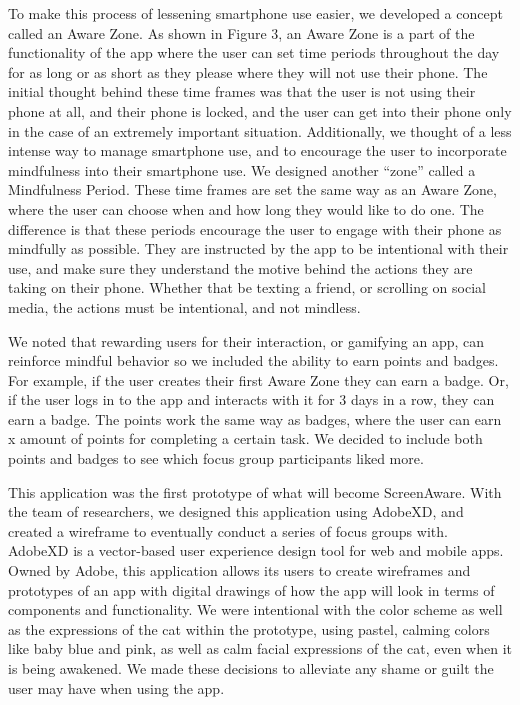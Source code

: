\documentclass[12pt, title page, manuscript, nonacm]{acmart}
\begin{document}
\par To make this process of lessening smartphone use easier, we developed a concept called an Aware Zone\cite{kim2019goalkeeper}. As shown in Figure 3, an Aware Zone is a part of the functionality of the app where the user can set time periods throughout the day for as long or as short as they please where they will not use their phone. The initial thought behind these time frames was that the user is not using their phone at all, and their phone is locked, and the user can get into their phone only in the case of an extremely important situation. Additionally, we thought of a less intense way to manage smartphone use, and to encourage the user to incorporate mindfulness into their smartphone use. We designed another “zone” called a Mindfulness Period\cite{weissinger2019mindful}. These time frames are set the same way as an Aware Zone, where the user can choose when and how long they would like to do one. The difference is that these periods encourage the user to engage with their phone as mindfully as possible. They are instructed by the app to be intentional with their use, and make sure they understand the motive behind the actions they are taking on their phone. Whether that be texting a friend, or scrolling on social media, the actions must be intentional, and not mindless. 
\par We noted that rewarding users for their interaction, or gamifying an app, can reinforce mindful behavior so we included the ability to earn points and badges\cite{weber2018convergence}. For example, if the user creates their first Aware Zone they can earn a badge. Or, if the user logs in to the app and interacts with it for 3 days in a row, they can earn a badge\cite{miller2016game}. The points work the same way as badges, where the user can earn x amount of points for completing a certain task. We decided to include both points and badges\cite{toth2016introduction} to see which focus group participants liked more.
\par This application was the first prototype of what will become ScreenAware. With the team of researchers, we designed this application using AdobeXD, and created a wireframe to eventually conduct a series of focus groups with. AdobeXD is a vector-based user experience design tool for web and mobile apps. Owned by Adobe, this application allows its users to create wireframes and prototypes of an app  with digital drawings of how the app will look in terms of components and functionality. 
We were intentional with the color scheme as well as the expressions of the cat within the prototype, using pastel, calming colors like baby blue and pink\cite{yildirim2011effects}, as well as calm facial expressions of the cat\cite{salminen2022can}, even when it is being awakened. We made these decisions to alleviate any shame or guilt the user may have when using the app\cite{wang2015role}.
\end{document}
